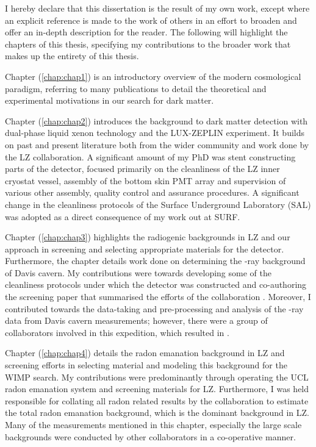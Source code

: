 \begin{declaration}
I hereby declare that this dissertation is the result of my own work, except where an explicit reference is made to the work of others in an effort to broaden and offer an in-depth description for the reader. The following will highlight the chapters of this thesis, specifying my contributions to the broader work that makes up the entirety of this thesis.
  
Chapter (\ref{chap:chap1}) is an introductory overview of the modern cosmological paradigm, referring to many publications to detail the theoretical and experimental motivations in our search for dark matter. 
  
Chapter (\ref{chap:chap2}) introduces the background to dark matter detection with dual-phase liquid xenon technology and the LUX-ZEPLIN experiment. It builds on past and present literature both from the wider community and work done by the LZ collaboration. A significant amount of my PhD was stent constructing parts of the detector, focused primarily on the cleanliness of the LZ inner cryostat vessel, assembly of the bottom skin PMT array and supervision of various other assembly, quality control and assurance procedures. A significant change in the cleanliness protocols of the Surface Underground Laboratory (SAL) was adopted as a direct consequence of my work out at SURF.
  
Chapter (\ref{chap:chap3}) highlights the radiogenic backgrounds in LZ and our approach in screening and selecting appropriate materials for the detector. Furthermore, the chapter details work done on determining the \gamma{}-ray background of Davis cavern. My contributions were towards developing some of the cleanliness protocols under which the detector was constructed and co-authoring the screening paper that summarised the efforts of the collaboration \cite{lz_screening}. Moreover, I contributed towards the data-taking and pre-processing and analysis of the \gamma{}-ray data from Davis cavern measurements; however, there were a group of collaborators involved in this expedition, which resulted in \cite{Akerib_2020_gray_measurements}.
  
Chapter (\ref{chap:chap4}) details the radon emanation background in LZ and screening efforts in selecting material and modeling this background for the WIMP search. My contributions were predominantly through operating the UCL radon emanation system and screening materials for LZ. Furthermore, I was held responsible for collating all radon related results by the collaboration to estimate the total radon emanation background, which is the dominant background in LZ. Many of the measurements mentioned in this chapter, especially the large scale backgrounds were conducted by other collaborators in a co-operative manner. 
  

\end{declaration}
